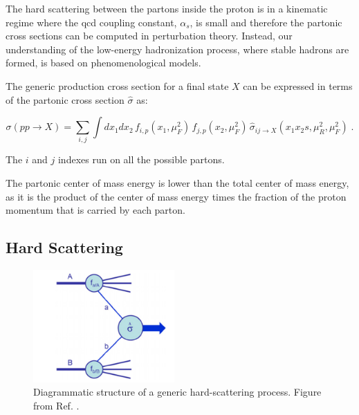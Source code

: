 The hard scattering between the partons inside the proton is in a kinematic regime where the \gls{qcd} coupling constant, $\alpha_s$, 
is small and therefore the partonic cross sections can be computed in perturbation theory. Instead, our understanding of the 
low-energy hadronization process, where stable hadrons are formed, is based on phenomenological models.

The generic production cross section for a final state $X$ can be expressed in terms of the partonic cross section $\hat\sigma$ as:

\begin{equation}
  \label{eq:general-cross-section}
  \sigma(pp\rightarrow X) = \sum_{i,j} \int dx_1 dx_2\, 
     f_{i,p}(x_1,\mu_F^2)\, f_{j,p}(x_2,\mu_F^2)\, 
     \hat\sigma_{ij\rightarrow X}(x_1 x_2 s, \mu_R^2, \mu_F^2) \; .
\end{equation}

The $i$ and $j$ indexes run on all the possible partons.  

The partonic center of mass energy \cmpart is lower than the total center of mass energy, as it is the product of the center of mass energy times
the fraction of the proton momentum that is carried by each parton. 

\subsection{Hard Scattering}

\cite{doi:10.1146}

\begin{figure}[h]
\begin{center}
    \includegraphics[width=0.48\textwidth]{figures/simul/ppcoll}
\end{center}
 \caption{Diagrammatic structure of a generic hard-scattering process. Figure from Ref. \cite{Campbell:2006wx}.}
  \label{fig:sim:pp}
\end{figure}

